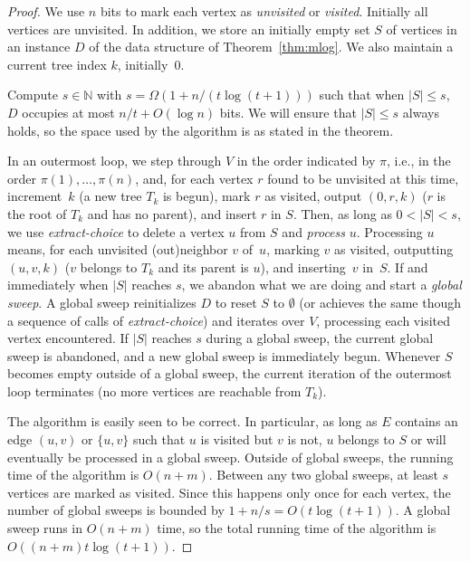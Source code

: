 \documentclass[envcountsame,envcountsect,undated,nolinenumbers]{lnthi}
\def\Tvn#1{\hbox{\textit{#1\/}}}
\def\TbbbN{\mathbb{N}}
\begin{document}
\begin{proof}
We use $n$ bits to mark each vertex as
\Tvn{unvisited} or \Tvn{visited}.
Initially all vertices are unvisited.
In addition, we store an
initially empty set $S$ of vertices in
an instance $D$ of the data structure
of Theorem~\ref{thm:mlog}.
We also maintain a current tree index $k$,
initially~0.

Compute $s\in\TbbbN$ with
$s=\Omega(1+{n/{(t\log(t+1))}})$
such that when $|S|\le s$, $D$ occupies
at most ${n/t}+O(\log n)$ bits.
We will ensure that $|S|\le s$ always holds,
so the space used by the algorithm
is as stated in the theorem.

In an outermost loop, we step through $V$ in the
order indicated by $\pi$, i.e.,
in the order $\pi(1),\ldots,\pi(n)$, and,
for each vertex $r$ found to be unvisited at this time,
increment~$k$
(a new tree $T_k$ is begun), mark $r$ as
visited, output
$(0,r,k)$ ($r$ is the root of $T_k$
and has no parent),
and insert $r$ in $S$.
Then, as long as $0<|S|<s$, we use
\Tvn{extract-choice} to delete a vertex $u$
from $S$ and \emph{process} $u$.
Processing $u$ means, for each unvisited (out)neighbor $v$ of~$u$,
marking $v$ as visited,
outputting $(u,v,k)$
($v$ belongs to $T_k$ and its parent is $u$), and
inserting~$v$ in~$S$.
If and immediately when $|S|$ reaches $s$, we abandon what
we are doing and start a \emph{global sweep}.
A global sweep reinitializes $D$ to reset
$S$ to $\emptyset$
(or achieves the same though a sequence of
calls of \Tvn{extract-choice})
and iterates over $V$, processing each visited vertex encountered.
If $|S|$ reaches $s$ during a global sweep,
the current global sweep is abandoned, and a new
global sweep is immediately begun.
Whenever $S$ becomes empty outside of a global sweep,
the current iteration of the outermost loop
terminates (no more vertices are reachable from $T_k$).

The algorithm is easily seen to be correct.
In particular, as long as $E$ contains an edge $(u,v)$
or $\{u,v\}$ such that $u$ is visited but $v$ is not,
$u$ belongs to $S$ or will eventually be processed
in a global sweep.
Outside of global sweeps, the running time of
the algorithm is $O(n+m)$.
Between any two global sweeps, at least $s$ vertices
are marked as visited.
Since this happens only once for each vertex,
the number of global sweeps is bounded by
$1+{n/s}=O(t\log(t+1))$.
A global sweep runs in $O(n+m)$ time, so the
total running time of the algorithm is
$O((n+m)t\log(t+1))$.
\end{proof}
\end{document}

